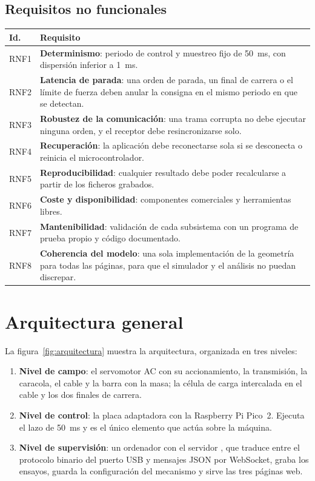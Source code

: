 \subsection{Requisitos no funcionales}

\begin{longtable}{@{}L{0.09\textwidth}L{0.85\textwidth}@{}}
\toprule
\textbf{Id.} & \textbf{Requisito} \\
\midrule
\endhead
RNF1 & \textbf{Determinismo}: periodo de control y muestreo fijo de \SI{50}{\milli\second}, con dispersión inferior a \SI{1}{\milli\second}. \\
RNF2 & \textbf{Latencia de parada}: una orden de parada, un final de carrera o el límite de fuerza deben anular la consigna en el mismo periodo en que se detectan. \\
RNF3 & \textbf{Robustez de la comunicación}: una trama corrupta no debe ejecutar ninguna orden, y el receptor debe resincronizarse solo. \\
RNF4 & \textbf{Recuperación}: la aplicación debe reconectarse sola si se desconecta o reinicia el microcontrolador. \\
RNF5 & \textbf{Reproducibilidad}: cualquier resultado debe poder recalcularse a partir de los ficheros grabados. \\
RNF6 & \textbf{Coste y disponibilidad}: componentes comerciales y herramientas libres. \\
RNF7 & \textbf{Mantenibilidad}: validación de cada subsistema con un programa de prueba propio y código documentado. \\
RNF8 & \textbf{Coherencia del modelo}: una sola implementación de la geometría para todas las páginas, para que el simulador y el análisis no puedan discrepar. \\
\bottomrule
\end{longtable}

\section{Arquitectura general}

La figura~\ref{fig:arquitectura} muestra la arquitectura, organizada en tres niveles:

\begin{enumerate}
  \item \textbf{Nivel de campo}: el servomotor AC con su accionamiento, la transmisión, la
        caracola, el cable y la barra con la masa; la célula de carga intercalada en el cable y los
        dos finales de carrera.
  \item \textbf{Nivel de control}: la placa adaptadora con la Raspberry Pi Pico~2. Ejecuta el lazo
        de \SI{50}{\milli\second} y es el único elemento que actúa sobre la máquina.
  \item \textbf{Nivel de supervisión}: un ordenador con el servidor , que
        traduce entre el protocolo binario del puerto USB y mensajes JSON por WebSocket, graba los
        ensayos, guarda la configuración del mecanismo y sirve las tres páginas web.
\end{enumerate}

